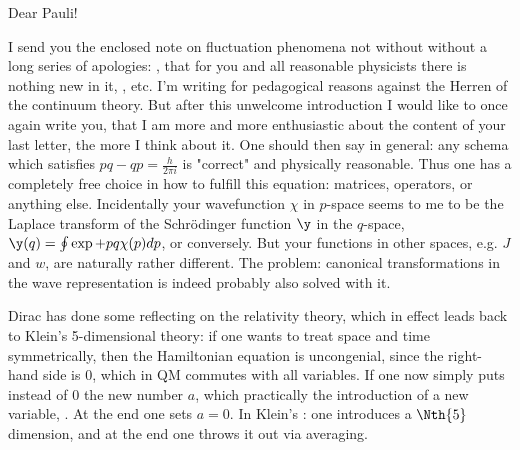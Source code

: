 \date{November 4, 1926}

Dear Pauli!

I send you the enclosed note on fluctuation phenomena not without without a long series of apologies: , that for you and all reasonable physicists there is nothing new in it, , etc. I'm writing for pedagogical reasons against the Herren of the continuum theory. But after this unwelcome introduction I would like to once again write you, that I am more and more enthusiastic about the content of your last letter, the more I think about it. One should then say in general: any schema which satisfies $pq-qp=\frac{h}{2\pi i}$ is "correct" and physically reasonable. Thus one has a completely free choice in how to fulfill this equation: matrices, operators, or anything else. Incidentally your wavefunction $\chi$ in $p$-space seems to me to be the Laplace transform of the Schr\"odinger function $\y$
in the $q$-space, $\y(q)=\oint\exp{+pq}\chi(p) dp$, or conversely. But your functions in other spaces, e.g. $J$ and $w$, are naturally rather different. The problem: canonical transformations in the wave representation is indeed probably also solved with it.

Dirac has done some reflecting on the relativity theory, which in effect leads back to Klein's 5-dimensional theory: if one wants to treat space and time symmetrically, then the Hamiltonian equation
is uncongenial, since the right-hand side is 0, which in QM commutes with all variables. If one now simply puts instead of 0 the new number $a$, which practically  the introduction of a new variable, . At the end one sets $a=0$. In Klein's : one introduces a $\Nth{5}$ dimension, and at the end one throws it out via averaging.

